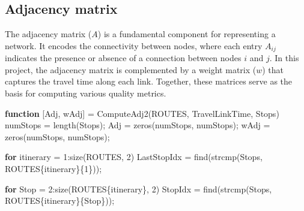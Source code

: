 \documentclass[
  letterpaper,
  DIV=11,
  numbers=noendperiod]{scrartcl}
\newenvironment{Shaded}{\begin{snugshade}}{\end{snugshade}}
\newcommand{\FloatTok}[1]{\textcolor[rgb]{0.68,0.00,0.00}{#1}}
\newcommand{\KeywordTok}[1]{\textcolor[rgb]{0.00,0.23,0.31}{\textbf{#1}}}
\newcommand{\NormalTok}[1]{\textcolor[rgb]{0.00,0.23,0.31}{#1}}
\newcommand{\OperatorTok}[1]{\textcolor[rgb]{0.37,0.37,0.37}{#1}}
\newcommand{\VariableTok}[1]{\textcolor[rgb]{0.07,0.07,0.07}{#1}}
\begin{document}
\subsection{Adjacency matrix}\label{adjacency-matrix}

The adjacency matrix (\(A\)) is a fundamental component for representing
a network. It encodes the connectivity between nodes, where each entry
\(A_{ij}\) indicates the presence or absence of a connection between
nodes \(i\) and \(j\). In this project, the adjacency matrix is
complemented by a weight matrix (\(w\)) that captures the travel time
along each link. Together, these matrices serve as the basis for
computing various quality metrics.

\begin{Shaded}
\begin{Highlighting}[]
\KeywordTok{function}\NormalTok{ [}\VariableTok{Adj}\OperatorTok{,} \VariableTok{wAdj}\NormalTok{] }\OperatorTok{=} \VariableTok{ComputeAdj2}\NormalTok{(}\VariableTok{ROUTES}\OperatorTok{,} \VariableTok{TravelLinkTime}\OperatorTok{,} \VariableTok{Stops}\NormalTok{)}
    \VariableTok{numStops} \OperatorTok{=} \VariableTok{length}\NormalTok{(}\VariableTok{Stops}\NormalTok{)}\OperatorTok{;}
    \VariableTok{Adj} \OperatorTok{=} \VariableTok{zeros}\NormalTok{(}\VariableTok{numStops}\OperatorTok{,} \VariableTok{numStops}\NormalTok{)}\OperatorTok{;}
    \VariableTok{wAdj} \OperatorTok{=} \VariableTok{zeros}\NormalTok{(}\VariableTok{numStops}\OperatorTok{,} \VariableTok{numStops}\NormalTok{)}\OperatorTok{;}

    \KeywordTok{for} \VariableTok{itinerary} \OperatorTok{=} \FloatTok{1}\OperatorTok{:}\VariableTok{size}\NormalTok{(}\VariableTok{ROUTES}\OperatorTok{,} \FloatTok{2}\NormalTok{)}
        \VariableTok{LastStopIdx} \OperatorTok{=} \VariableTok{find}\NormalTok{(}\VariableTok{strcmp}\NormalTok{(}\VariableTok{Stops}\OperatorTok{,} \VariableTok{ROUTES}\NormalTok{\{}\VariableTok{itinerary}\NormalTok{\}\{}\FloatTok{1}\NormalTok{\}))}\OperatorTok{;}

        \KeywordTok{for} \VariableTok{Stop} \OperatorTok{=} \FloatTok{2}\OperatorTok{:}\VariableTok{size}\NormalTok{(}\VariableTok{ROUTES}\NormalTok{\{}\VariableTok{itinerary}\NormalTok{\}}\OperatorTok{,} \FloatTok{2}\NormalTok{)}
            \VariableTok{StopIdx} \OperatorTok{=} \VariableTok{find}\NormalTok{(}\VariableTok{strcmp}\NormalTok{(}\VariableTok{Stops}\OperatorTok{,} \VariableTok{ROUTES}\NormalTok{\{}\VariableTok{itinerary}\NormalTok{\}\{}\VariableTok{Stop}\NormalTok{\}))}\OperatorTok{;}


\end{Highlighting}
\end{Shaded}
\end{document}
